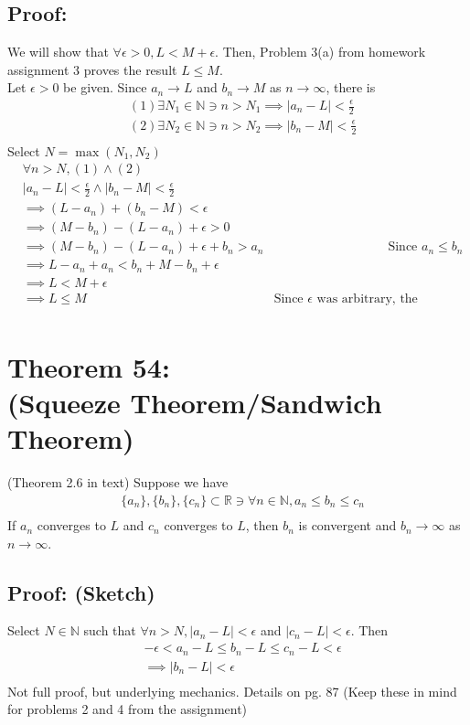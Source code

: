 \documentclass{article}
\begin{document}
\subsection{Proof:}
We will show that $\forall \epsilon > 0, L < M + \epsilon$. Then, Problem 3(a) from homework assignment 3 proves the result $L \leq M$.\\
Let $\epsilon > 0$ be given. Since $a_n \rightarrow L$ and $b_n \rightarrow M$ as $n \rightarrow \infty$, there is
\begin{align*}
 	& (1) \exists N_1 \in \mathbb{N} \ni n > N_1 \implies | a_n - L| < \frac{\epsilon}{2} \\
 	& (2) \exists N_2 \in \mathbb{N} \ni n > N_2 \implies | b_n - M| < \frac{\epsilon}{2} \\
\end{align*}
Select $N = \max(N_1, N_2)$
\begin{align*}
 	& \forall n > N, (1) \wedge (2) && \\
 	& |a_n - L| < \frac{\epsilon}{2} \wedge |b_n - M| < \frac{\epsilon}{2} && \\
 	& \implies (L - a_n) + (b_n - M) < \epsilon && \\
 	& \implies (M - b_n) - (L - a_n) + \epsilon > 0 && \\
 	& \implies (M - b_n) - (L - a_n) + \epsilon +b_n > a_n && \text{Since } a_n \leq b_n \\
 	& \implies L - a_n + a_n < b_n + M - b_n + \epsilon && \\
 	& \implies L < M + \epsilon && \\
 	& \implies L \leq M & \text{Since $\epsilon$ was arbitrary, the result is proved}\\
\end{align*}
\section{Theorem 54: \\(Squeeze Theorem/Sandwich Theorem)}
(Theorem 2.6 in text) Suppose we have
\begin{align*}
 	& \{a_n\}, \{ b_n \}, \{ c_n\} \subset \mathbb{R} \ni \forall n \in \mathbb{N}, a_n \leq b_n \leq c_n \\
\end{align*}
If $a_n$ converges to $L$ and $c_n$ converges to $L$, then $b_n$ is convergent and $b_n \rightarrow \infty$ as $n \rightarrow \infty$.
\subsection{Proof: (Sketch)}
Select $N \in \mathbb{N}$ such that $\forall n > N, |a_n - L| < \epsilon$ and $|c_n - L| < \epsilon$. Then
\begin{align*}
 	& -\epsilon < a_n - L \leq b_n - L \leq c_n - L < \epsilon \\
 	& \implies | b_n - L | < \epsilon \\
\end{align*}
Not full proof, but underlying mechanics. Details on pg. 87 (Keep these in mind for problems 2 and 4 from the assignment)
\end{document}
